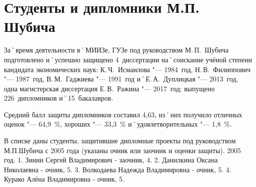 ﻿\section{Студенты и дипломники М.П. Шубича}
За˚время деятельности в˚МИИЗе, ГУЗе под руководством М.\,П.~Шубича подготовлено и˚успешно защищено 4~диссертации на˚соискание учёной степени кандидата экономических наук: К.\,Ч.~Исмаилова "--- 1984~год, Н.\,В.~Филиппович "--- 1987~год, В.\,М.~Гаджиева "--- 1991~год и˚Е.\,А.~Дуплицкая "--- 2013~год, одна магистерская диссертация Е.\,В.~Ражина "--- 2017~год; выпущено 226~дипломников и˚15~бакалавров.

Средний балл защиты дипломников составил 4,63, из˚них получило отличных оценок "--- 64,9~\%, хороших "--- 33,3~\% и˚удовлетворительных "--- 1,8~\%.

В списке даны студенты, защитившие дипломные проекты под руководством М.П.Шубича с 2005 года (указаны очник или заочник и оценки защиты).
2005 год.
1. Зинин Сергей Владимирович - заочник, 4.
2. Данилкина Оксана Николаевна - очник, 5.
3. Волкодаева Надежда Владимировна - очник, 5.
4. Курако Алёна Владимировна - очник, 5.
